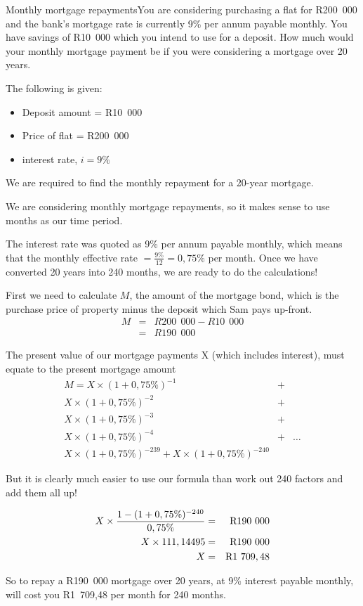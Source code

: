 \begin{wex}{Monthly mortgage repayments}{You are considering purchasing a flat for R200~000 and the bank's mortgage rate is currently 9\% per annum payable monthly. You have savings of R10~000 which you intend to use for a deposit. How much would your monthly mortgage payment be if you were considering a mortgage over 20 years.}{
The following is given:
\begin{itemize}
\item{Deposit amount = R10~000}
\item{Price of flat = R200~000}
\item{interest rate, $i=9\%$}
\end{itemize}
We are required to find the monthly repayment for a 20-year mortgage.

We are considering monthly mortgage repayments, so it makes sense to use months as our time period.

The interest rate was quoted as 9\% per annum payable monthly, which means that the monthly effective rate $= \frac{9\%}{12} = 0,75\%$ per month. Once we have converted 20 years into 240 months, we are ready to do the calculations!

First we need to calculate $M$, the amount of the mortgage bond, which is the purchase price of property minus the deposit which Sam pays up-front.
\begin{eqnarray*}
M &=& R200\:~000 - R10\:~000\\
&=& R190\:~000
\end{eqnarray*}

The present value of our mortgage payments X (which includes interest), must equate to the present mortgage amount
\begin{eqnarray*}
M = X\times (1 + 0,75\%)^{-1}&+& \\
X\times (1 + 0,75\%)^{-2}&+& \\
X\times (1 + 0,75\%)^{-3}&+& \\
X\times (1 + 0,75\%)^{-4} &+& \ldots \\
X\times (1 + 0,75\%)^{-239}+ X\times (1 + 0,75\%)^{-240}
\end{eqnarray*}

But it is clearly much easier to use our formula than work out 240 factors and add them all up!

\begin{eqnarray*}
X \times \frac{1 - (1 + 0,75\%)^{-240}}{0,75\%} &=& \rm{R}190~000\\
X \times 111,14495 &=& \rm{R}190~000\\
X &=& \rm{R}1~709,48
\end{eqnarray*}

So to repay a R190~000 mortgage over 20 years, at 9\% interest payable monthly, will cost you R1~709,48 per month for 240 months.}
\end{wex}

